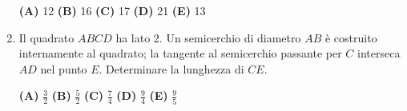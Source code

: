 \documentclass{article}
\begin{document}
\begin{enumerate}
		\vspace{0.15cm}
		\textbf{(A)} 12 \hspace{0.5cm}
		\textbf{(B)} 16 \hspace{0.5cm}
		\textbf{(C)} 17 \hspace{0.5cm}
		\textbf{(D)} 21 \hspace{0.5cm}
		\textbf{(E)} 13 \hspace{0.5cm}

	\item Il quadrato $ABCD$ ha lato 2. Un semicerchio di diametro $AB$ è
		costruito internamente al quadrato; la tangente al semicerchio
		passante per $C$ interseca $AD$ nel punto $E$.
		Determinare la lunghezza di $CE$.

		\vspace{0.15cm}
		\textbf{(A)} $\frac{3}{2}$ \hspace{0.5cm}
		\textbf{(B)} $\frac{5}{2}$ \hspace{0.5cm}
		\textbf{(C)} $\frac{7}{4}$ \hspace{0.5cm}
		\textbf{(D)} $\frac{9}{4}$ \hspace{0.5cm}
		\textbf{(E)} $\frac{9}{5}$ \hspace{0.5cm}

\end{enumerate}
\end{document}
